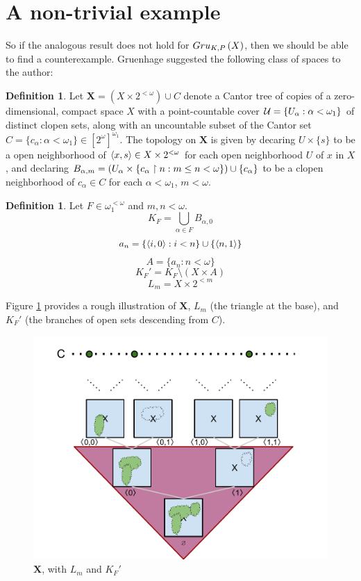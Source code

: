 \documentclass{amsart}
\theoremstyle{definition}
\newtheorem{definition}[theorem]{Definition}
\begin{document}
\section{A non-trivial example}

So if the analogous result does not hold for $Gru_{K,P}\left({X}\right)$, then we
should be able to find a counterexample. Gruenhage suggested the following
class of spaces to the author:

\begin{definition}
  Let $\pmb X=(X\times 2^{<\omega})\cup C$ denote a Cantor tree
  of copies of a zero-dimensional, compact space $X$ with a point-countable
  cover $\mathcal{U} = \{U_\alpha : \alpha<\omega_1\}$ of distinct
  clopen sets, along with an uncountable subset of the Cantor set
  $C=\{c_\alpha:\alpha<\omega_1\}\in [2^\omega]^{\omega_1}$.
  The topology on $\pmb X$ is given by decaring $U\times\{s\}$ to be a open
  neighborhood of $\langle x,s\rangle\in X\times 2^{<\omega}$ for each
  open neighborhood $U$ of $x$ in $X$, and declaring
  $
    B_{\alpha,m}
      =
    (U_\alpha\times\{c_\alpha\restriction n: m\leq n<\omega\})\cup\{c_\alpha\}
  $
  to be a clopen neighborhood of $c_\alpha\in C$ for each $\alpha<\omega_1$,
  $m<\omega$.
\end{definition}

\begin{definition}
  Let $F\in \omega_1^{<\omega}$ and $m,n<\omega$.
  \[
    K_F = \bigcup_{\alpha \in F} B_{\alpha,0}
  \]
  \[
    a_n = \{\langle i,0\rangle:i<n\}\cup\{\langle n,1\rangle\}
  \]
  \[
    A = \{a_n : n<\omega\}
  \]
  \[
    K_F' = K_F \setminus (X \times A)
  \]
  \[
    L_m = X \times 2^{<m}
  \]
\end{definition}

Figure \ref{fig:pmbX} provides a rough illustration of
$\pmb X$, $L_m$ (the triangle at the base), and $K_F'$
(the branches of open sets descending from $C$).

\begin{figure}
  \centering
  \includegraphics[width=\linewidth]{pmbX.pdf}
  \caption{$\pmb X$, with $L_m$ and $K_F'$}
  \label{fig:pmbX}
\end{figure}
\end{document}

